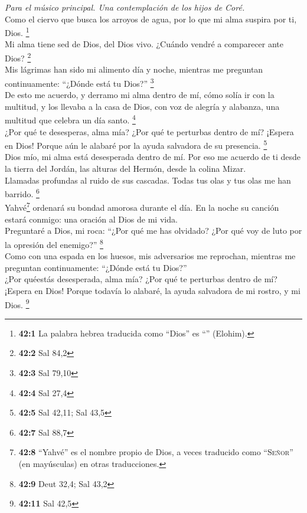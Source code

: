 \emph{Para el músico principal. Una contemplación de los hijos de
Coré.}\\
 Como el ciervo que busca los arroyos de agua, por lo que
mi alma suspira por ti, Dios. \footnote{\textbf{42:1} La palabra hebrea
  traducida como ``Dios'' es ``'' (Elohim).}\\
 Mi alma tiene sed de Dios, del Dios vivo. ¿Cuándo vendré
a comparecer ante Dios? \footnote{\textbf{42:2} Sal 84,2}\\
 Mis lágrimas han sido mi alimento día y noche, mientras
me preguntan continuamente: ``¿Dónde está tu Dios?'' \footnote{\textbf{42:3}
  Sal 79,10}\\
 De esto me acuerdo, y derramo mi alma dentro de mí, cómo
solía ir con la multitud, y los llevaba a la casa de Dios, con voz de
alegría y alabanza, una multitud que celebra un día santo. \footnote{\textbf{42:4}
  Sal 27,4}\\
 ¿Por qué te desesperas, alma mía? ¿Por qué te perturbas
dentro de mí? ¡Espera en Dios! Porque aún le alabaré por la ayuda
salvadora de su presencia. \footnote{\textbf{42:5} Sal 42,11; Sal 43,5}\\
 Dios mío, mi alma está desesperada dentro de mí. Por eso
me acuerdo de ti desde la tierra del Jordán, las alturas del Hermón,
desde la colina Mizar.\\
 Llamadas profundas al ruido de sus cascadas. Todas tus
olas y tus olas me han barrido. \footnote{\textbf{42:7} Sal 88,7}\\
 Yahvé\footnote{\textbf{42:8} ``Yahvé'' es el nombre
  propio de Dios, a veces traducido como ``\textsc{Señor}'' (en
  mayúsculas) en otras traducciones.} ordenará su bondad amorosa durante
el día. En la noche su canción estará conmigo: una oración al Dios de mi
vida.\\
 Preguntaré a Dios, mi roca: ``¿Por qué me has olvidado?
¿Por qué voy de luto por la opresión del enemigo?'' \footnote{\textbf{42:9}
  Deut 32,4; Sal 43,2}\\
 Como con una espada en los huesos, mis adversarios me
reprochan, mientras me preguntan continuamente: ``¿Dónde está tu
Dios?''\\
 ¿Por quéestás desesperada, alma mía? ¿Por qué te
perturbas dentro de mí? ¡Espera en Dios! Porque todavía lo alabaré, la
ayuda salvadora de mi rostro, y mi Dios. \footnote{\textbf{42:11} Sal
  42,5}

